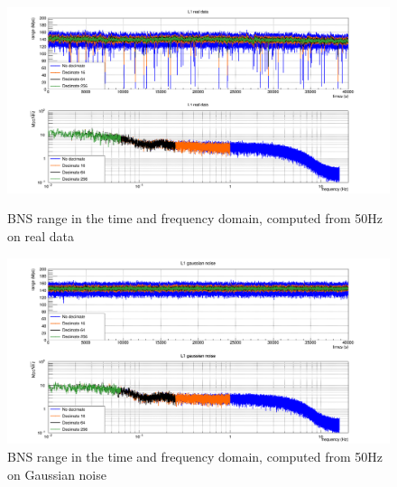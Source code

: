 %

\begin{figure}
  \centering
  \begin{minipage}{\linewidth}
    \includegraphics[width=\linewidth]{sectionBadTriggers/PSD/Range/range_PSD/cReal_L1_50Hz_BNS.png}
    \caption{BNS range in the time and frequency domain, computed from 50Hz on real data}
    \label{fig:rangeReal_BNS_50}
  \end{minipage}
  \hfill
  \vspace{0.4cm}
  \begin{minipage}{\linewidth}
    \includegraphics[width=\linewidth]{sectionBadTriggers/PSD/Range/range_PSD/cGaus_L1_50Hz_BNS.png}
    \caption{BNS range in the time and frequency domain, computed from 50Hz on Gaussian noise}
    \label{fig:rangeGaus_BNS_50}
  \end{minipage}
\end{figure}








